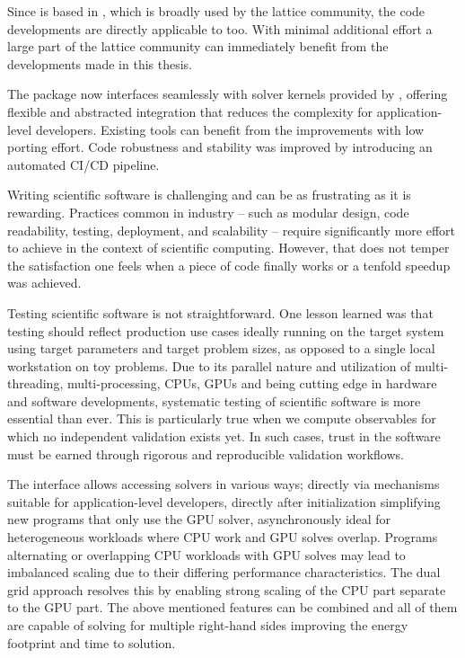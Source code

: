 Since \openqxd is based in \openqcd, which is broadly used by the lattice community, the code developments are directly applicable to \openqcd too.
With minimal additional effort a large part of the lattice community can immediately benefit from the developments made in this thesis.

The \openqxd package now interfaces seamlessly with solver kernels provided by \quda, offering flexible and abstracted integration that reduces the complexity for application-level developers.
Existing tools can benefit from the improvements with low porting effort.
Code robustness and stability was improved by introducing an automated CI/CD pipeline.

Writing scientific software is challenging and can be as frustrating as it is rewarding.
Practices common in industry -- such as modular design, code readability, testing, deployment, and scalability -- require significantly more effort to achieve in the context of scientific computing.
However, that does not temper the satisfaction one feels when a piece of code finally works or a tenfold speedup was achieved.

Testing scientific software is not straightforward.
One lesson learned was that testing should reflect production use cases ideally running on the target system using target parameters and target problem sizes, as opposed to a single local workstation on toy problems.
Due to its parallel nature and utilization of multi-threading, multi-processing, CPUs, GPUs and being cutting edge in hardware and software developments, systematic testing of scientific software is more essential than ever.
This is particularly true when we compute observables for which no independent validation exists yet.
In such cases, trust in the software must be earned through rigorous and reproducible validation workflows.

The interface allows accessing solvers in various ways; directly via \openqxd mechanisms suitable for application-level developers, directly after initialization simplifying new programs that only use the GPU solver, asynchronously ideal for heterogeneous workloads where CPU work and GPU solves overlap.
Programs alternating or overlapping CPU workloads with GPU solves may lead to imbalanced scaling due to their differing performance characteristics.
The dual grid approach resolves this by enabling strong scaling of the CPU part separate to the GPU part.
The above mentioned features can be combined and all of them are capable of solving for multiple right-hand sides improving the energy footprint and time to solution.

